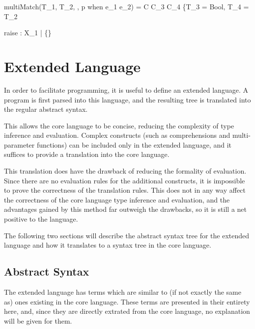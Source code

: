 \documentclass{article}
\begin{document}
  {multiMatch(T_1, T_2, \Gamma, p \; \mbox{when} \; e_1 \rightarrow e_2) = C \cup C_3 \cup C_4 \cup \{T_3 = Bool, T_4 = T_2}


\bigskip

    {\Gamma \vdash raise : X_1 \; | \; \{\}}

\newpage

\section{Extended Language}

In order to facilitate programming, it is useful to define an extended language.
A program is first parsed into this language, and the resulting tree is translated into the regular abstract syntax.

This allows the core language to be concise, reducing the complexity of type inference and evaluation.
Complex constructs (such as comprehensions and multi-parameter functions) can be included only in the extended language, and it suffices to provide a translation into the core language.

This translation does have the drawback of reducing the formality of evaluation.
Since there are no evaluation rules for the additional constructs, it is impossible to prove the correctness of the translation rules.
This does not in any way affect the correctness of the core language type inference and evaluation, and the advantages gained by this method far outweigh the drawbacks, so it is still a net positive to the language.

\medskip

The following two sections will describe the abstract syntax tree for the extended language and how it translates to a syntax tree in the core language.

\subsection{Abstract Syntax}

The extended language has terms which are similar to (if not exactly the same as) ones existing in the core language.
These terms are presented in their entirety here, and, since they are directly extrated from the core language, no explanation will be given for them.
\end{document}
